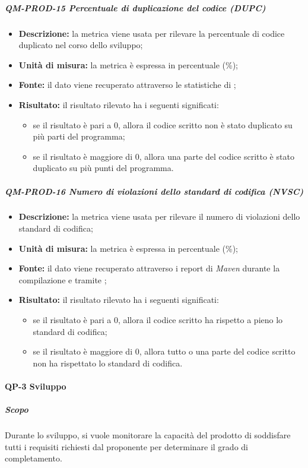 			\subparagraph{QM-PROD-15 Percentuale di duplicazione del codice (DUPC)}
			\begin{itemize}
      			\item \textbf{Descrizione: }
					la metrica viene usata per rilevare la percentuale di codice duplicato nel corso dello sviluppo;
				\item \textbf{Unità di misura: }
					la metrica è espressa in percentuale (\%);
				\item \textbf{Fonte: }
					il dato viene recuperato attraverso le statistiche di ;
				\item \textbf{Risultato: }
					il risultato rilevato ha i seguenti significati:
					\begin{itemize}
						\item se il risultato è pari a 0, allora il codice scritto non è stato duplicato su più parti del programma;
						\item se il risultato è maggiore di 0, allora una parte del codice scritto è stato duplicato su più punti del programma.
					\end{itemize}
			\end{itemize}
			\subparagraph{QM-PROD-16 Numero di violazioni dello standard di codifica (NVSC)}
			\begin{itemize}
      			\item \textbf{Descrizione: }
					la metrica viene usata per rilevare il numero di violazioni dello standard di codifica;
				\item \textbf{Unità di misura: }
					la metrica è espressa in percentuale (\%);
				\item \textbf{Fonte: }
					il dato viene recuperato attraverso i report di \textit{Maven} durante la compilazione e tramite ;
				\item \textbf{Risultato: }
					il risultato rilevato ha i seguenti significati:
					\begin{itemize}
						\item se il risultato è pari a 0, allora il codice scritto ha rispetto a pieno lo standard di codifica;
						\item se il risultato è maggiore di 0, allora tutto o una parte del codice scritto non ha rispettato lo standard di codifica.
					\end{itemize}
			\end{itemize}



		\paragraph{QP-3 Sviluppo}
			\subparagraph{Scopo}
			Durante lo sviluppo, si vuole monitorare la capacità del prodotto di soddisfare tutti i requisiti richiesti dal proponente per determinare il grado di completamento.

